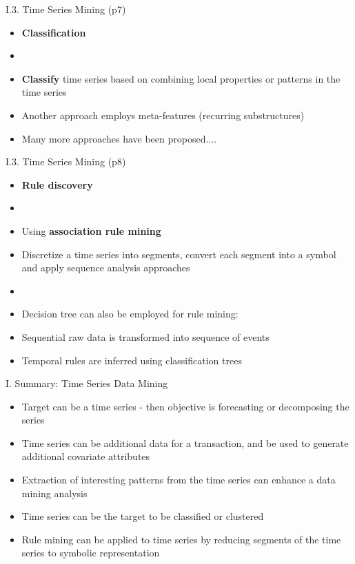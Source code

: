 \documentclass[handout]{beamer}
\newcommand{\strong}[1]{\textbf{\color{teal} #1}}
\newcommand{\stronger}[1]{\textbf{\color{purple} #1}}
\begin{document}
\begin{frame}{I.3. Time Series Mining (p7)}
\begin{itemize}
\item[] \stronger{Classification}
\item[]
\item \strong{Classify} time series based on combining local properties or patterns in the time series
\item Another approach employs meta-features (recurring substructures) 
\item Many more approaches have been proposed....
\end{itemize}
\end{frame}
\begin{frame}{I.3. Time Series Mining (p8)}
\begin{itemize}
\item[] \stronger{Rule discovery}
\item[]
\item Using \strong{association rule mining}
\item Discretize a time series into segments, convert each segment into a symbol and apply sequence analysis approaches
\item[]
\item[] Decision tree can also be employed for rule mining:
\item Sequential raw data is transformed into sequence of events
\item Temporal rules are inferred using classification trees 
\end{itemize}
\end{frame}
\begin{frame}{I. Summary: Time Series Data Mining}
\begin{itemize}
\item Target can be a time series - then objective is forecasting or decomposing the series
\item Time series can be additional data for a transaction, and be used to generate additional covariate attributes
\item Extraction of interesting patterns from the time series can enhance a data mining analysis
\item Time series can be the target to be classified or clustered
\item Rule mining can be applied to time series by reducing segments of the time series to symbolic representation
\end{itemize}
\end{frame}
\end{document}
